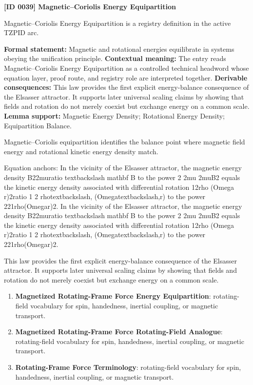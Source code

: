 \clearpage
\noindent\textbf{[ID 0039] Magnetic--Coriolis Energy Equipartition}\par
\vspace{0.35em}
\begingroup\small
{}
Magnetic--Coriolis Energy Equipartition is a registry definition in the active TZPID arc.

\begingroup\footnotesize\setlength{\emergencystretch}{3em}\sloppy
\textbf{Formal statement:} Magnetic and rotational energies equilibrate in systems obeying the unification principle. \textbf{Contextual meaning:} The entry reads Magnetic--Coriolis Energy Equipartition as a controlled technical headword whose equation layer, proof route, and registry role are interpreted together. \textbf{Derivable consequences:} This law provides the first explicit energy-balance consequence of the Elsasser attractor. It supports later universal scaling claims by showing that fields and rotation do not merely coexist but exchange energy on a common scale. \textbf{Lemma support:} Magnetic Energy Density; Rotational Energy Density; Equipartition Balance.\par
\endgroup

Magnetic--Coriolis equipartition identifies the balance point where magnetic field energy and rotational kinetic energy density match.

Equation anchors: In the vicinity of the Elsasser attractor, the magnetic energy density B22muratio textbackslash mathbf B to the power 2 2mu 2muB2 equals the kinetic energy density associated with differential rotation 12rho (Omega r)2ratio 1 2 rhotextbackslash, (Omegatextbackslash,r) to the power 221rho(Omegar)2. In the vicinity of the Elsasser attractor, the magnetic energy density B22muratio textbackslash mathbf B to the power 2 2mu 2muB2 equals the kinetic energy density associated with differential rotation 12rho (Omega r)2ratio 1 2 rhotextbackslash, (Omegatextbackslash,r) to the power 221rho(Omegar)2.

This law provides the first explicit energy-balance consequence of the Elsasser attractor. It supports later universal scaling claims by showing that fields and rotation do not merely coexist but exchange energy on a common scale.
\endgroup

\begingroup\footnotesize\sloppy
\begin{enumerate}[leftmargin=1.35em,itemsep=1pt,topsep=1pt,parsep=0pt]
\item \textbf{Magnetized Rotating-Frame Force Energy Equipartition}: rotating-field vocabulary for spin, handedness, inertial coupling, or magnetic transport.
\item \textbf{Magnetized Rotating-Frame Force Rotating-Field Analogue}: rotating-field vocabulary for spin, handedness, inertial coupling, or magnetic transport.
\item \textbf{Rotating-Frame Force Terminology}: rotating-field vocabulary for spin, handedness, inertial coupling, or magnetic transport.
\end{enumerate}
\endgroup

